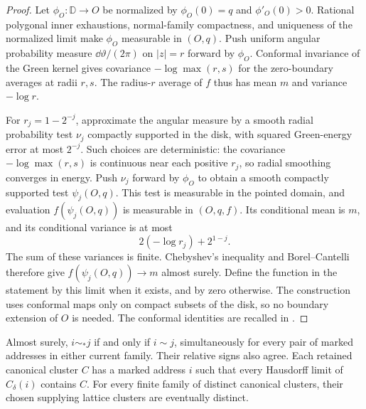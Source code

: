 \begin{proof}
Let \(\phi_O:\mathbb D\to O\) be normalized by
\(\phi_O(0)=q\) and \(\phi'_O(0)>0\). Rational polygonal inner
exhaustions, normal-family compactness, and uniqueness of the normalized
limit make \(\phi_O\) measurable in \((O,q)\).
Push uniform angular probability measure \(\dd\vartheta/(2\pi)\) on
\(|z|=r\) forward by \(\phi_O\). Conformal invariance of the Green
kernel gives covariance \(-\log\max(r,s)\) for the zero-boundary
averages at radii \(r,s\). The radius-\(r\) average of \(f\) thus has
mean \(m\) and variance \(-\log r\).

For \(r_j=1-2^{-j}\), approximate the angular measure by a smooth
radial probability test \(\nu_j\) compactly supported in the disk,
with squared Green-energy error at most \(2^{-j}\).
Such choices are deterministic: the covariance
\(-\log\max(r,s)\) is continuous near each positive \(r_j\), so
radial smoothing converges in energy. Push \(\nu_j\) forward by
\(\phi_O\) to obtain a smooth compactly supported test \(\psi_j(O,q)\).
This test is measurable in the pointed domain, and evaluation
\(f(\psi_j(O,q))\) is measurable in \((O,q,f)\). Its conditional
mean is \(m\), and its conditional variance is at most
\[
 2(-\log r_j)+2^{1-j}.
\]
The sum of these variances is finite. Chebyshev's inequality and
Borel--Cantelli therefore give \(f(\psi_j(O,q))\to m\) almost surely.
Define the function in the statement by this limit when it exists,
and by zero otherwise. The construction uses conformal maps only on
compact subsets of the disk, so no boundary extension of \(O\) is
needed. The conformal identities are recalled in
\cite[Chapter~6, Sections~1.1 and~5.2]{Ahlfors1979}.
\end{proof}

\begin{proposition}
\label{prop:partition}
Almost surely, \(i\sim_*j\) if and only if \(i\sim j\), simultaneously
for every pair of marked addresses in either current family. Their
relative signs also agree. Each retained canonical cluster \(C\) has
a marked address \(i\) such that every Hausdorff limit of
\(C_\delta(i)\) contains \(C\). For every finite family of distinct
canonical clusters, their chosen supplying lattice clusters are
eventually distinct.
\end{proposition}

